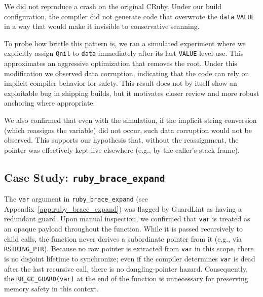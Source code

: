 We did not reproduce a crash on the original CRuby. Under our build configuration, the compiler did not generate code that overwrote the \texttt{data} \texttt{VALUE} in a way that would make it invisible to conservative scanning.

To probe how brittle this pattern is, we ran a simulated experiment where we explicitly assign \texttt{Qnil} to \texttt{data} immediately after its last \texttt{VALUE}-level use. This approximates an aggressive optimization that removes the root. Under this modification we observed data corruption, indicating that the code can rely on implicit compiler behavior for safety. This result does not by itself show an exploitable bug in shipping builds, but it motivates closer review and more robust anchoring where appropriate.

We also confirmed that even with the simulation, if the implicit string conversion (which reassigns the variable) did not occur, such data corruption would not be observed. This supports our hypothesis that, without the reassignment, the pointer was effectively kept live elsewhere (e.g., by the caller's stack frame).

\subsection{Case Study: \texttt{ruby\_brace\_expand}}
The \texttt{var} argument in \texttt{ruby\_brace\_expand} (see Appendix~\ref{app:ruby_brace_expand}) was flagged by GuardLint as having a redundant guard. Upon manual inspection, we confirmed that \texttt{var} is treated as an opaque payload throughout the function. While it is passed recursively to child calls, the function never derives a subordinate pointer from it (e.g., via \texttt{RSTRING\_PTR}). Because no raw pointer is extracted from \texttt{var} in this scope, there is no disjoint lifetime to synchronize; even if the compiler determines \texttt{var} is dead after the last recursive call, there is no dangling-pointer hazard. Consequently, the \texttt{RB\_GC\_GUARD(var)} at the end of the function is unnecessary for preserving memory safety in this context.
